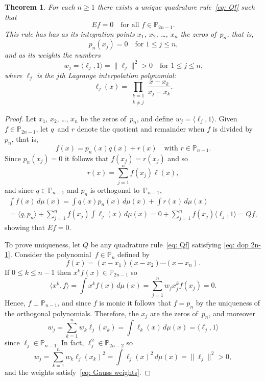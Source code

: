 \documentclass[12pt,a4paper]{article}
\newtheorem{theorem}{Theorem}
\newcommand{\iprod}[1]{\langle#1\rangle}
\newcommand{\Poly}{\mathbb{P}}
\begin{document}
\begin{theorem}\label{thm: Gauss rule}
For each $n\ge1$ there exists a unique quadrature rule~\eqref{eq: Qf}
such that
\begin{equation}\label{eq: dop 2n-1}
Ef=0\quad\text{for all $f\in\Poly_{2n-1}$.}
\end{equation}
This rule has has as its integration points $x_1$, $x_2$, \dots, 
$x_n$ the zeros of~$p_n$, that is,
\[
p_n(x_j)=0\quad\text{for $1\le j\le n$,}
\]
and as its weights the numbers
\begin{equation}\label{eq: Gauss weights}
w_j=\iprod{\ell_j,1}=\|\ell_j\|^2>0
	\quad\text{for $1\le j\le n$,}
\end{equation}
where $\ell_j$ is the $j$th Lagrange interpolation polynomial:
\[
\ell_j(x)=\prod_{\substack{k=1\\ k\ne j}}\frac{x-x_k}{x_j-x_k}.
\]
\end{theorem}
\begin{proof}
Let $x_1$, $x_2$, \dots, $x_n$ be the zeros of~$p_n$, and define
$w_j=\iprod{\ell_j,1}$.  Given $f\in\Poly_{2n-1}$, let $q$~and $r$ 
denote the quotient and remainder when $f$ is divided by~$p_n$, that 
is,
\[
f(x)=p_n(x)q(x)+r(x)\quad\text{with $r\in\Poly_{n-1}$.}
\]
Since $p_n(x_j)=0$ it follows that $f(x_j)=r(x_j)$ and so
\[
r(x)=\sum_{j=1}^n f(x_j)\ell(x),
\]
and since $q\in\Poly_{n-1}$ and $p_n$ is orthogonal to~$\Poly_{n-1}$,
\begin{multline*}
\int f(x)\,d\mu(x)=\int q(x)p_n(x)\,d\mu(x)+\int r(x)\,d\mu(x)\\
	=\iprod{q,p_n}+\sum_{j=1}^n f(x_j)\int\ell_j(x)\,d\mu(x)
	=0+\sum_{j=1}^n f(x_j)\iprod{\ell_j,1}=Qf,
\end{multline*}
showing that $Ef=0$.  

To prove uniqueness, let $Q$ be any quadrature rule~\eqref{eq: Qf} 
satisfying \eqref{eq: dop 2n-1}.  Consider the 
polynomial~$f\in\Poly_n$ defined by
\[
f(x)=(x-x_1)(x-x_2)\cdots(x-x_n).
\]
If $0\le k\le n-1$ then $x^kf(x)\in\Poly_{2n-1}$ so
\[
\iprod{x^k,f}=\int x^kf(x)\,d\mu(x)=\sum_{j=1}^n w_jx_j^kf(x_j)=0.
\]
Hence, $f\perp\Poly_{n-1}$, and since $f$ is monic it follows that 
$f=p_n$ by the uniqueness of the orthogonal polynomials.  Therefore,
the $x_j$ are the zeros of~$p_n$, and moreover
\[
w_j=\sum_{k=1}^nw_k\ell_j(x_k)=\int\ell_k(x)\,d\mu(x)=\iprod{\ell_j,1}
\]
since $\ell_j\in\Poly_{n-1}$.  In fact, $\ell_j^2\in\Poly_{2n-2}$ so
\[
w_j=\sum_{k=1}^nw_k\ell_j(x_k)^2=\int\ell_j(x)^2\,d\mu(x)
	=\|\ell_j\|^2>0,
\]
and the weights satisfy~\eqref{eq: Gauss weights}.
\end{proof}
\end{document}
